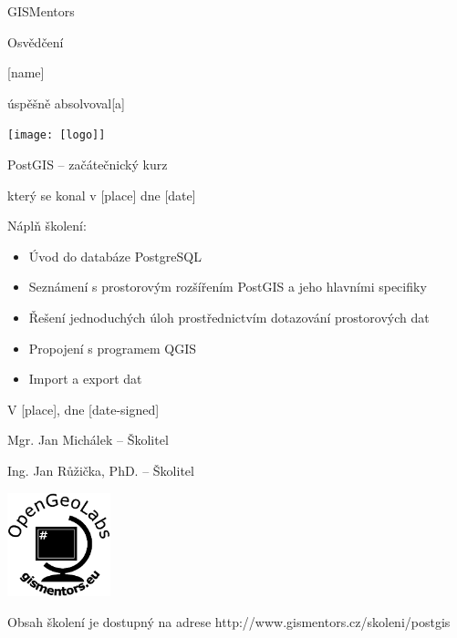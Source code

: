 \documentclass[12pt, a4paper]{letter}
\begin{document}
\pagestyle{empty}
\begin{center}

{\Large GISMentors}

{\Huge Osvědčení}

{\Large [name]}

úspěšně absolvoval[a]

\texttt{[image: [logo]]}

{\Large PostGIS -- začátečnický kurz}

který se konal v [place] dne [date]
\end{center}

Náplň školení:

\begin{itemize}
    \item Úvod do databáze PostgreSQL
    \item Seznámení s prostorovým rozšířením PostGIS a jeho hlavními specifiky
    \item Řešení jednoduchých úloh prostřednictvím dotazování prostorových dat
    \item Propojení s programem QGIS
    \item Import a export dat
\end{itemize}

\vfill
\parbox{7cm}{

    V [place], dne [date-signed]\\

\vfill

    Mgr. Jan Michálek -- Školitel \\

\vfill

    Ing. Jan Růžička, PhD. -- Školitel
}
\hfill
\parbox{3cm}{
    \includegraphics[width=3cm]{../images/placka.eps}
}

\vfill

\begin{center}
{\footnotesize Obsah školení je dostupný na adrese
http://www.gismentors.cz/skoleni/postgis}
\end{center}
\end{document}
